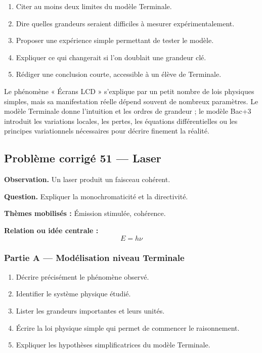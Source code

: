 \documentclass[11pt,a4paper]{article}
\begin{document}
\begin{enumerate}
  \item Citer au moins deux limites du modèle Terminale.
  \item Dire quelles grandeurs seraient difficiles à mesurer expérimentalement.
  \item Proposer une expérience simple permettant de tester le modèle.
  \item Expliquer ce qui changerait si l'on doublait une grandeur clé.
  \item Rédiger une conclusion courte, accessible à un élève de Terminale.
\end{enumerate}

\begin{corrigebox}
Le phénomène « Écrans LCD » s'explique par un petit nombre de lois physiques simples, mais sa manifestation réelle dépend souvent de nombreux paramètres. Le modèle Terminale donne l'intuition et les ordres de grandeur ; le modèle Bac+3 introduit les variations locales, les pertes, les équations différentielles ou les principes variationnels nécessaires pour décrire finement la réalité.
\end{corrigebox}

\subsection{Problème corrigé 51 — Laser}

\begin{exercicebox}
\textbf{Observation.} Un laser produit un faisceau cohérent.

\medskip
\textbf{Question.} Expliquer la monochromaticité et la directivité.

\medskip
\textbf{Thèmes mobilisés :} Émission stimulée, cohérence.

\medskip
\textbf{Relation ou idée centrale :}
\[
E=h\nu
\]
\end{exercicebox}

\subsubsection*{Partie A — Modélisation niveau Terminale}

\begin{enumerate}
  \item Décrire précisément le phénomène observé.
  \item Identifier le système physique étudié.
  \item Lister les grandeurs importantes et leurs unités.
  \item Écrire la loi physique simple qui permet de commencer le raisonnement.
  \item Expliquer les hypothèses simplificatrices du modèle Terminale.
\end{enumerate}
\end{document}
